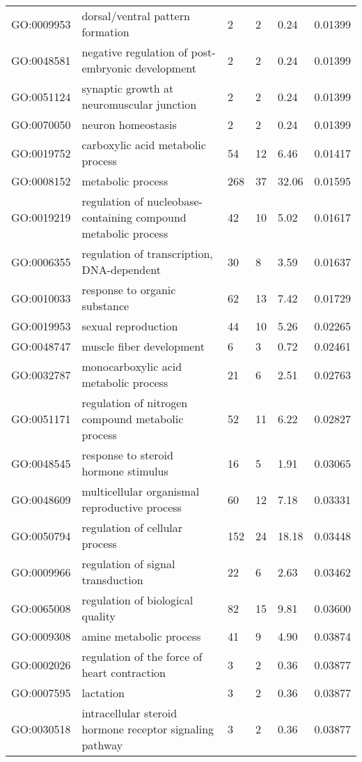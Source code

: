 \documentclass[10pt]{bmc_article}
\newenvironment{bmcformat}{\begin{raggedright}\baselineskip20pt\sloppy\setboolean{publ}{false}}{\end{raggedright}\baselineskip20pt\sloppy}
\begin{document}
\begin{bmcformat}
\begin{longtable}{lp{4.5cm}llll}
  GO:0009953 & dorsal/ventral pattern formation &   2 &   2 & 0.24 & 0.01399 \\ 
  GO:0048581 & negative regulation of post-embryonic development &   2 &   2 & 0.24 & 0.01399 \\ 
  GO:0051124 & synaptic growth at neuromuscular junction &   2 &   2 & 0.24 & 0.01399 \\ 
  GO:0070050 & neuron homeostasis &   2 &   2 & 0.24 & 0.01399 \\ 
  GO:0019752 & carboxylic acid metabolic process &  54 &  12 & 6.46 & 0.01417 \\ 
  GO:0008152 & metabolic process & 268 &  37 & 32.06 & 0.01595 \\ 
  GO:0019219 & regulation of nucleobase-containing compound metabolic process &  42 &  10 & 5.02 & 0.01617 \\ 
  GO:0006355 & regulation of transcription, DNA-dependent &  30 &   8 & 3.59 & 0.01637 \\ 
  GO:0010033 & response to organic substance &  62 &  13 & 7.42 & 0.01729 \\ 
  GO:0019953 & sexual reproduction &  44 &  10 & 5.26 & 0.02265 \\ 
  GO:0048747 & muscle fiber development &   6 &   3 & 0.72 & 0.02461 \\ 
  GO:0032787 & monocarboxylic acid metabolic process &  21 &   6 & 2.51 & 0.02763 \\ 
  GO:0051171 & regulation of nitrogen compound metabolic process &  52 &  11 & 6.22 & 0.02827 \\ 
  GO:0048545 & response to steroid hormone stimulus &  16 &   5 & 1.91 & 0.03065 \\ 
  GO:0048609 & multicellular organismal reproductive process &  60 &  12 & 7.18 & 0.03331 \\ 
  GO:0050794 & regulation of cellular process & 152 &  24 & 18.18 & 0.03448 \\ 
  GO:0009966 & regulation of signal transduction &  22 &   6 & 2.63 & 0.03462 \\ 
  GO:0065008 & regulation of biological quality &  82 &  15 & 9.81 & 0.03600 \\ 
  GO:0009308 & amine metabolic process &  41 &   9 & 4.90 & 0.03874 \\ 
  GO:0002026 & regulation of the force of heart contraction &   3 &   2 & 0.36 & 0.03877 \\ 
  GO:0007595 & lactation &   3 &   2 & 0.36 & 0.03877 \\ 
  GO:0030518 & intracellular steroid hormone receptor signaling pathway &   3 &   2 & 0.36 & 0.03877 \\ 

\end{longtable}
\end{bmcformat}
\end{document}
